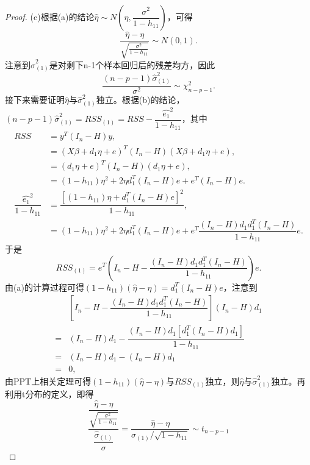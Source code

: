 \documentclass[cn,hazy,green,12pt,normal]{elegantnote}
\numberwithin{equation}{section}
\numberwithin{subsection}{section}
\begin{document}
\begin{proof}
\noindent (c)根据(a)的结论$\hat{\eta} \sim N(\eta,\dfrac{\sigma^2}{1-h_{11}})$，可得
$$
\dfrac{\hat{\eta}-\eta}{\sqrt{\frac{\sigma^2}{1-h_{11}}}}\sim N(0,1).
$$
注意到$\hat{\sigma}^2_{(1)}$是对剩下n-1个样本回归后的残差均方，因此
$$
\dfrac{(n-p-1)\hat{\sigma}^2_{(1)}}{\sigma^2} \sim \chi_{n-p-1}^2.
$$
接下来需要证明$\hat{\eta}$与$\hat{\sigma}^2_{(1)}$独立。根据(b)的结论，$(n-p-1)\hat{\sigma}^2_{(1)} = RSS_{(1)} = RSS - \dfrac{\hat{e_1}^2}{1-h_{11}}$，其中
\begin{align*}
    RSS &= y^T (I_n-H) y, \\
    &= (X\beta+d_1\eta+e)^T (I_n-H) (X\beta+d_1\eta+e), \\
    &= (d_1\eta+e)^T (I_n-H) (d_1\eta+e), \\
    &= (1-h_{11}) \eta^2 + 2 \eta d_1^T (I_n-H) e + e^T (I_n-H) e. \\
    \dfrac{\hat{e_1}^2}{1-h_{11}} &= \dfrac{\left[(1-h_{11})\eta + d_1^T (I_n-H) e\right]^2}{1-h_{11}}, \\
    &= (1-h_{11}) \eta^2 + 2 \eta d_1^T (I_n-H) e + e^T \dfrac{(I_n-H)d_1d_1^T(I_n-H)}{1-h_{11}} e.
\end{align*}
于是
$$
RSS_{(1)}=e^T(I_n-H-\dfrac{(I_n-H)d_1d_1^T(I_n-H)}{1-h_{11}})e.
$$
由(a)的计算过程可得$(1-h_{11}) (\hat{\eta}-\eta) = d_1^T (I_n-H) e$，注意到
\begin{align*}
    & \left[I_n-H-\dfrac{(I_n-H)d_1d_1^T(I_n-H)}{1-h_{11}}\right](I_n-H)d_1 \\
    =& (I_n-H)d_1-\dfrac{(I_n-H)d_1[d_1^T(I_n-H)d_1]}{1-h_{11}} \\
    =& (I_n-H)d_1-(I_n-H)d_1 \\
    =& 0,
\end{align*}
由PPT上相关定理可得$(1-h_{11}) (\hat{\eta}-\eta)$与$RSS_{(1)}$独立，则$\hat{\eta}$与$\hat{\sigma}^2_{(1)}$独立。再利用t分布的定义，即得
\[\dfrac{\dfrac{\hat{\eta}-\eta}{\sqrt{\frac{\sigma^2}{1-h_{11}}}}}{\dfrac{\hat{\sigma}_{(1)}}{\sigma}}=\dfrac{\hat{\eta}-\eta}{\sigma_{(1)}/\sqrt{1-h_{11}}}\sim t_{n-p-1} \]

\end{proof}
\end{document}
